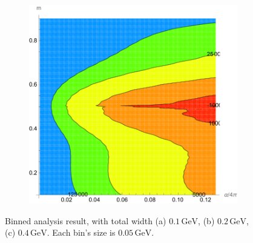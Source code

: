 \documentclass[10pt]{article}
\theoremstyle{definition}
\theoremstyle{remark}
\begin{document}
\begin{figure}[h]
\begin{subfigure}{0.3\textwidth}
			\caption{}
		\end{subfigure}
		\begin{subfigure}{0.3\textwidth}
			\centering
			\includegraphics[width=\textwidth]{binned_0.4GeV.pdf}
			\caption{}
		\end{subfigure}
		\caption{Binned analysis result, with total width (a) $0.1\,\mathrm{GeV}$, (b) $0.2\,\mathrm{GeV}$, (c) $0.4\,\mathrm{GeV}$. Each bin's size is $0.05\,\mathrm{GeV}$.}
		\label{fig:binned}
	\end{figure}
	
	
	
\end{document}
